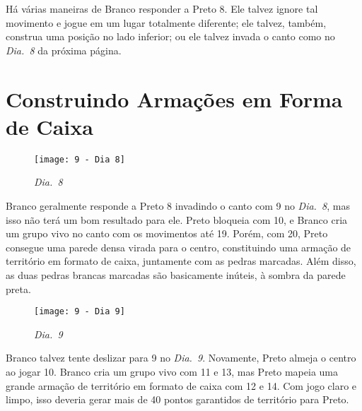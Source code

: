 Há várias maneiras de Branco responder a Preto 8. Ele talvez ignore tal movimento e jogue em um lugar totalmente diferente; ele talvez, também, construa uma posição no lado inferior; ou ele talvez invada o canto como no \emph{Dia.\@~8} da próxima página.

\pagebreak

\section{Construindo Armações em Forma de Caixa}

\begin{wrapfigure}{r}{60mm}
    \vspace{-27.5pt}
    \begin{center}
        \texttt{[image: 9 - Dia 8]}
        \captionsetup{justification=centering}
        \caption*{\emph{Dia.\@~8}}
    \end{center}
    \vspace{-32.5pt}
\end{wrapfigure}

Branco geralmente responde a Preto 8 invadindo o canto com 9 no \emph{Dia.\@~8}, mas isso não terá um bom resultado para ele. Preto bloqueia com 10, e Branco cria um grupo vivo no canto com os movimentos até 19. Porém, com 20, Preto consegue uma parede densa virada para o centro, constituindo uma armação de território em formato de caixa, juntamente com as pedras marcadas. Além disso, as duas pedras brancas marcadas são basicamente inúteis, à sombra da parede preta.

\begin{wrapfigure}{l}{60mm}
    \vspace{-27.5pt}
    \begin{center}
        \texttt{[image: 9 - Dia 9]}
        \captionsetup{justification=centering}
        \caption*{\emph{Dia.\@~9}}
    \end{center}
    \vspace{-80pt}
\end{wrapfigure}

\bigskip

Branco talvez tente deslizar  para 9 no \emph{Dia.\@~9}. Novamente, Preto almeja o centro ao jogar 10. Branco cria um grupo vivo com 11 e 13, mas Preto mapeia uma grande armação de território em formato de caixa com 12 e 14. Com jogo claro e limpo, isso deveria gerar mais de 40 pontos garantidos de território para Preto.

